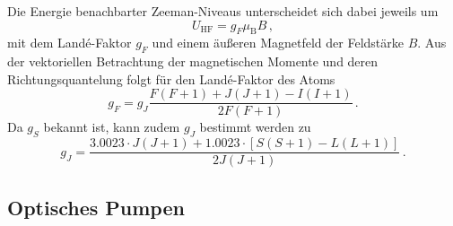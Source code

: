 Die Energie benachbarter Zeeman-Niveaus unterscheidet sich dabei jeweils um
\begin{equation}
\label{eq:zeeman_energie}
    U_\text{HF} = g_F \mu_\text{B} B\,,
\end{equation}
mit dem Landé-Faktor $g_F$ und einem äußeren Magnetfeld der Feldstärke $B$.
Aus der vektoriellen Betrachtung der magnetischen Momente und deren Richtungsquantelung folgt für den Landé-Faktor des Atoms
\begin{equation}
\label{eq:lande_faktor}
    g_F = g_J \frac{F(F+1) + J(J+1) - I(I+1)}{2F(F+1)}\,.
\end{equation}
Da $g_S$ bekannt ist, kann zudem $g_J$ bestimmt werden zu
\begin{equation}
\label{eq:gj}
    g_J = \frac{\num{3.0023}\cdot J(J+1)
                + \num{1.0023}\cdot\left[S(S+1) - L(L+1)\right]}
               {2J(J+1)}
          \,.
\end{equation}

\subsection{Optisches Pumpen}
\label{subsec:optisches_pumpen}

